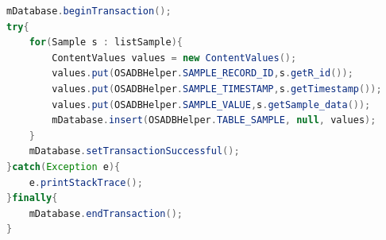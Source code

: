 \begin{minipage}{\linewidth}
\begin{lstlisting}[caption={SQLite insert samples transaction}, label = {listing:SQLiteSampleTrans}, captionpos=b, language=Java]
mDatabase.beginTransaction();
try{
    for(Sample s : listSample){
        ContentValues values = new ContentValues();
        values.put(OSADBHelper.SAMPLE_RECORD_ID,s.getR_id());
        values.put(OSADBHelper.SAMPLE_TIMESTAMP,s.getTimestamp());
        values.put(OSADBHelper.SAMPLE_VALUE,s.getSample_data());
        mDatabase.insert(OSADBHelper.TABLE_SAMPLE, null, values);
    }
    mDatabase.setTransactionSuccessful();
}catch(Exception e){
    e.printStackTrace();
}finally{
    mDatabase.endTransaction();
}
\end{lstlisting}
\end{minipage}
